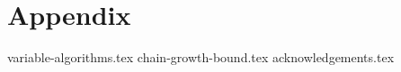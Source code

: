 \section*{Appendix}

{variable-algorithms.tex}
{chain-growth-bound.tex}
\ifanonymous\else
{acknowledgements.tex}
\fi
